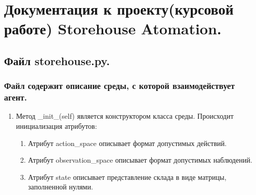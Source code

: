 \documentclass[12pt,a4paper]{article}
\renewcommand{\theenumii}{\asbuk{enumii}}
\begin{document}
\section*{Документация к проекту(курсовой работе) Storehouse Atomation.}
\renewcommand{\theenumii}{\asbuk{enumii}}
\AddEnumerateCounter{\asbuk}{\@asbuk}{\cyrm}
\hrulefill

\subsection*{Файл storehouse.py.}
\subsubsection*{Файл содержит описание среды, с которой взаимодействует агент.}

\begin{enumerate}
\item Метод \_init\_(self) является конструктором класса среды. Происходит инициализация атрибутов:
\begin{enumerate}
\item Атрибут action\_space описывает формат допустимых действий.
\item Атрибут observation\_space описывает формат допустимых наблюдений.
\item Атрибут state описывает представление склада в виде матрицы, заполненной нулями.
\end{enumerate}

\end{enumerate}
\end{document}
